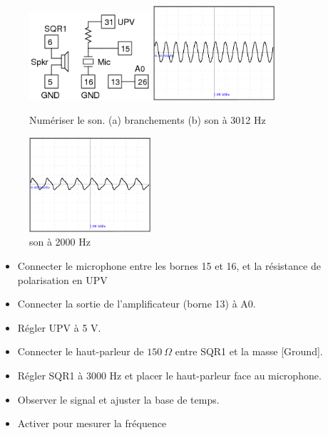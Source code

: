 \documentclass{book}
\begin{document}
\begin{figure}[h!]
\begin{center}
\caption{\label{fig:Digitized-sound-screen}Numériser le son. (a) branchements (b) son à 3012 Hz }\vspace{0.5em}
\includegraphics[width=0.4\textwidth, height=0.3\textwidth, keepaspectratio]{Schematic-sound-freq.png}
\includegraphics[width=0.4\textwidth, height=0.3\textwidth, keepaspectratio]{Pic-sound3012hz.png}
\end{center}
\end{figure}



\begin{figure}[h!]
\begin{center}
\caption{\label{}son à 2000 Hz }\vspace{0.5em}
\includegraphics[width=0.4\textwidth, height=0.3\textwidth, keepaspectratio]{Pic-sound2000hz.png}
\end{center}
\end{figure}



\begin{itemize}
  \item Connecter le microphone entre les bornes 15 et 16, et la résistance de polarisation en UPV
  \item Connecter la sortie de l'amplificateur (borne 13) à A0.
  \item Régler UPV à 5 V.
  \item Connecter le haut-parleur de $150\ \Omega$  entre SQR1 et la masse [Ground].
  \item Régler SQR1 à 3000 Hz et placer le haut-parleur face au microphone.
  \item Observer le signal et ajuster la base de temps.
  \item Activer   pour mesurer la fréquence
\end{itemize}
\end{document}
